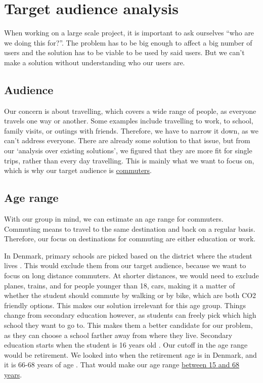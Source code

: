 \section{Target audience analysis}

When working on a large scale project, it is important to ask ourselves ``who are we doing this for?''. The problem has to be big enough to affect a big number of users and the solution has to be viable to be used by said users. But we can't make a solution without understanding who our users are. 

\subsection{Audience}

Our concern is about travelling, which covers a wide range of people, as everyone travels one way or another. Some examples include travelling to work, to school, family visits, or outings with friends. Therefore, we have to narrow it down, as we can't address everyone. There are already some solution to that issue, but from our `analysis over existing solutions', we figured that they are more fit for single trips, rather than every day travelling. This is mainly what we want to focus on, which is why our target audience is \underline{commuters}. 

\subsection{Age range}

With our group in mind, we can estimate an age range for commuters. Commuting means to travel to the same destination and back on a regular basis. Therefore, our focus on destinations for commuting are either education or work. 

In Denmark, primary schools are picked based on the district where the student lives \cite{primary_school}. This would exclude them from our target audience, because we want to focus on long distance commuters. At shorter distances, we would need to exclude planes, trains, and for people younger than 18, cars, making it a matter of whether the student should commute by walking or by bike, which are both CO2 friendly options. This makes our solution irrelevant for this age group. Things change from secondary education however, as students can freely pick which high school they want to go to. This makes them a better candidate for our problem, as they can choose a school farther away from where they live. Secondary education starts when the student is 16 years old \cite{secondary_school}. Our cutoff in the age range would be retirement. We looked into when the retirement age is in Denmark, and it is 66-68 years of age \cite{retirement}. That would make our age range \underline{between 15 and 68 years}.

